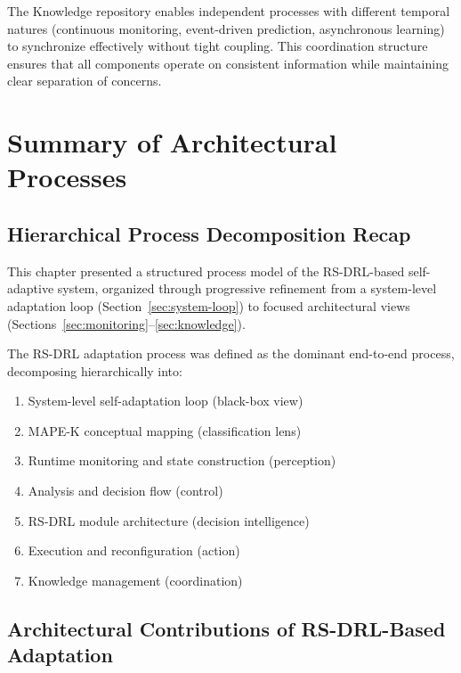 \documentclass[11pt,a4paper]{article}
\begin{document}
The Knowledge repository enables independent processes with different temporal natures (continuous monitoring, event-driven prediction, asynchronous learning) to synchronize effectively without tight coupling. This coordination structure ensures that all components operate on consistent information while maintaining clear separation of concerns.


\section{Summary of Architectural Processes}
\label{sec:summary}

\subsection{Hierarchical Process Decomposition Recap}
\label{subsec:decomposition-recap}

This chapter presented a structured process model of the RS-DRL-based self-adaptive system, organized through progressive refinement from a system-level adaptation loop (Section~\ref{sec:system-loop}) to focused architectural views (Sections~\ref{sec:monitoring}--\ref{sec:knowledge}).

The RS-DRL adaptation process was defined as the dominant end-to-end process, decomposing hierarchically into:

\begin{enumerate}
    \item System-level self-adaptation loop (black-box view)
    \item MAPE-K conceptual mapping (classification lens)
    \item Runtime monitoring and state construction (perception)
    \item Analysis and decision flow (control)
    \item RS-DRL module architecture (decision intelligence)
    \item Execution and reconfiguration (action)
    \item Knowledge management (coordination)
\end{enumerate}

\subsection{Architectural Contributions of RS-DRL-Based Adaptation}
\label{subsec:contributions}
\end{document}
